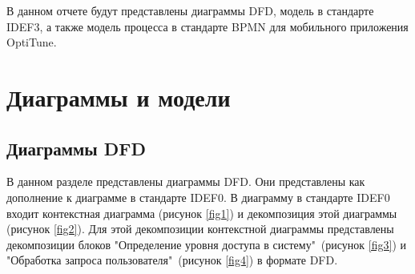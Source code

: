 \documentclass[14pt]{extreport}
\begin{document}
\pagestyle{empty} 


\pagestyle{plain}
\tableofcontents
 

\intro 

В данном отчете будут представлены диаграммы DFD, модель в стандарте IDEF3, а также модель процесса в стандарте BPMN для мобильного приложения OptiTune.


\chapter{Диаграммы и модели\label{chapter1}}
\section{Диаграммы DFD}

В данном разделе представлены диаграммы DFD. Они представлены как дополнение к диаграмме в стандарте IDEF0. В диаграмму в стандарте IDEF0 входит контекстная диаграмма  (рисунок \ref{fig1}) и декомпозиция этой диаграммы  (рисунок \ref{fig2}). Для этой декомпозиции контекстной диаграммы представлены  декомпозиции блоков "Определение уровня доступа в систему"\ (рисунок \ref{fig3}) и "Обработка запроса пользователя"\ (рисунок \ref{fig4}) в формате DFD.
\end{document}
